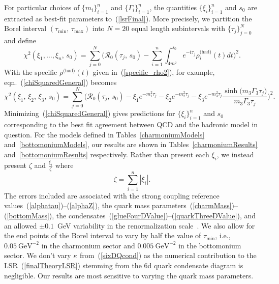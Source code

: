 \documentclass[11pt, letterpaper]{article}
\newcommand{\lsr}{\mathcal{R}_{0}}
\newcommand{\double}[2]{(#1,\,#2)}
\newcommand{\dif}[1]{d #1}
\begin{document}
For particular choices of $\{m_i\}_{i=1}^n$ and $\{\Gamma_i\}_{i=1}^n$, the
quantities $\{\xi_i\}_{i=1}^n$ and $s_0$ are extracted as best-fit parameters
to~(\ref{lsrFinal}).
More precisely, we partition the Borel interval
$\double{\tau_{\text{min}}}{\tau_{\text{max}}}$ into $N=20$ equal length
subintervals with $\{\tau_j\}_{j=0}^N$ and define
%
\begin{equation}\label{chiSquaredGeneral}
  \chi^2(\xi_1,\ldots,\xi_n,\,s_0)=\sum_{j=0}^N
  \Bigg(
    \lsr\double{\tau_j}{s_0}-
    \sum_{i=1}^n \int_{4m^2}^{s_0} e^{-t\tau_j}
    \rho^{\text{(had)}}_i(t)\dif{t}
  \Bigg)^2.
\end{equation}
%
With the specific $\rho^{\text{(had)}}(t)$ given in~(\ref{specific_rho2}),
for example, eqn.~(\ref{chiSquaredGeneral}) becomes
%
\begin{equation}\label{chiSquaredDefn}
  \chi^2(\xi_1,\,\xi_2,\,\xi_3,\,s_0)=\sum_{j=0}^N
  \Bigg(
    \lsr\double{\tau_j}{s_0}-
    \xi_1 e^{-m_1^2 \tau_j}
    - \xi_2 e^{-m_2^2 \tau_j}
    - \xi_3 e^{-m_3^2 \tau_j}\frac{\sinh\big(m_3\Gamma_3\tau_j\big)}{m_3\Gamma_3\tau_j}
  \Bigg)^2.
\end{equation}
%
Minimizing~(\ref{chiSquaredGeneral}) gives predictions for $\{\xi_i\}_{i=1}^n$
and $s_0$ corresponding to the best fit agreement between QCD and the hadronic model
in question.
For the models defined in Tables~\ref{charmoniumModels} and~\ref{bottomoniumModels}, 
our results are shown in Tables~\ref{charmoniumResults} 
and~\ref{bottomoniumResults} respectively.
Rather than present each $\xi_i$, we instead present 
$\zeta$ and $\frac{\xi_i}{\zeta}$ where
%
\begin{equation}\label{zeta}
  \zeta=\sum_{i=1}^n |\xi_i|.
\end{equation}
%
The errors included are associated with
the strong coupling reference values~(\ref{alphatau})--(\ref{alphaZ}),
the quark mass parameters~(\ref{charmMass})--(\ref{bottomMass}),
the condensates~(\ref{glueFourDValue})--(\ref{quarkThreeDValue}),
and an allowed $\pm0.1$~GeV variability in the renormalization 
scale~\cite{Narison:2014ska}.
We also allow for the end points of the Borel interval to vary by half the value of 
$\tau_{\text{min}}$, i.e., 
$0.05\ \text{GeV}^{-2}$ in the charmonium sector and
$0.005\ \text{GeV}^{-2}$ in the bottomonium sector. 
We don't vary $\kappa$ from~(\ref{sixDQcond}) as the numerical contribution 
to the LSR~(\ref{finalTheoryLSR}) stemming from the 6d quark condensate diagram is negligible. 
Our results are most sensitive to varying the quark mass parameters.
\end{document}

